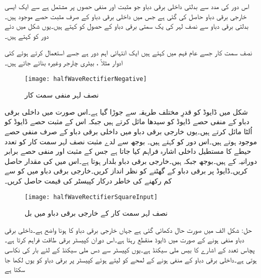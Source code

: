 اس دور کی مدد سے بدلتی داخلی برقی دباو جو مثبت اور منفی حصوں پر مشتمل ہے سے ایک ایسی خارجی برقی دباو حاصل کی گئی ہے جس میں داخلی برقی دباو کے صرف مثبت حصے موجود ہیں۔ بدلتی برقی دباو سے نصف لہر کی یک سمتی برقی دباو کے حصول کو   کہتے ہیں۔یوں شکل  میں دئے دور کو   کہتے ہیں۔

نصف سمت کار جسے عام فہم میں  کہتے ہیں ایک انتہائی اہم دور ہے جسے استعمال کرتے ہوئے کئی ادوار مثلاً   ، بیٹری چارجر وغیرہ بنائے جاتے ہیں۔
\begin{figure}
\centering
\texttt{[image: halfWaveRectifierNegative]}
\caption{نصف لہر منفی سمت کار}
\label{شکل_نصف_لہر_منفی_سمت_کار}
\end{figure}
شکل  میں ڈایوڈ کو قدرِ مختلف طریقہ سے جوڑا گیا ہے۔اس صورت میں داخلی برقی دباو  کے منفی حصے ڈایوڈ کو سیدھا مائل کرتے ہیں جبکہ اس کے مثبت حصے ڈایوڈ کو اُلٹا مائل کرتے ہیں۔یوں خارجی برقی دباو میں داخلی برقی دباو کے صرف منفی حصے موجود ہوتے ہیں۔اس دور کو  کہتے ہیں۔
بوجھ سے لدے مثبت نصف لہر سمت کار کو  تعدد  حیطے کا مستطیل داخلی اشارہ فراہم کیا جاتا ہے جس کے مثبت اور منفی حصے برابر دورانیہ کے ہیں۔بوجھ  جبکہ  ہیں۔خارجی برقی دباو بلدار ہوتا ہے۔اس میں  کی مقدار حاصل کریں۔ڈایوڈ پر برقی دباو کے گھٹنے کو نظر انداز کریں۔خارجی برقی دباو میں  کو  سے کم رکھنے کی خاطر درکار کپیسٹر کی قیمت حاصل کریں۔
\begin{figure}
\centering
\texttt{[image: halfWaveRectifierSquareInput]}
\caption{نصف لہر سمت کار کے خارجی برقی دباو میں بل}
\label{شکل_نصف_لہر_سمتکار_بل}
\end{figure}
حل:
شکل  الف میں صورت حال دکھائی گئی ہے جہاں خارجی برقی دباو کا  ہونا واضح ہے۔داخلی برقی دباو منفی ہونے کے صورت میں ڈایوڈ منقطع رہتا ہے۔اس دوران کپیسٹر  برقی طاقت فراہم کرتا ہے۔پچاس تعدد کے اشارے کا  بیس ملی سیکنڈ ہے۔یوں کپیسٹر سے دس ملی سیکنڈ کے لئے بار کی نکاسی ہوتی ہے۔داخلی برقی دباو کے منفی ہونے کے لمحے کو  لیتے ہوئے کپیسٹر پر برقی دباو  کو یوں لکھا جا سکتا ہے
